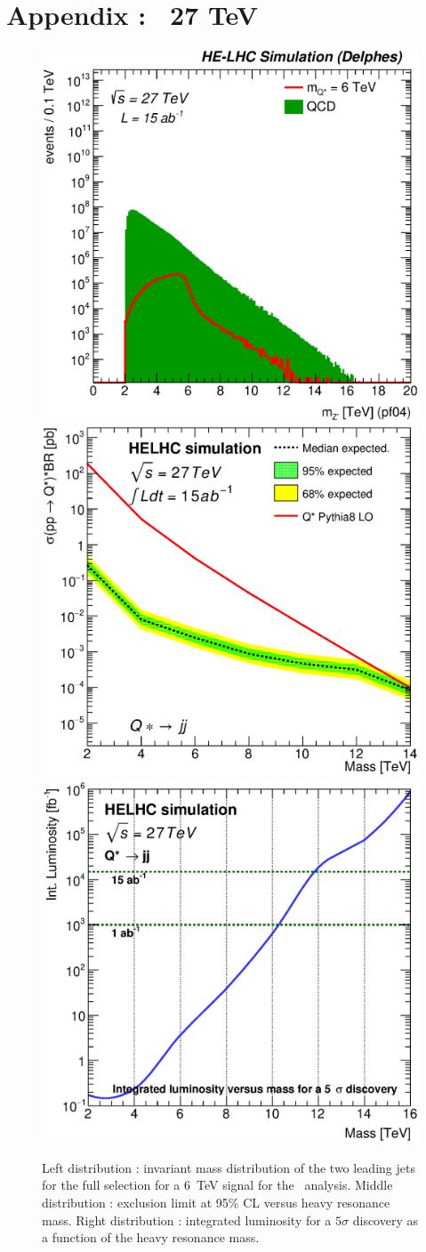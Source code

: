 \clearpage
\newpage

\section{Appendix :  \texorpdfstring{\qjj}{qjj}\ 27 TeV}
\label{appendix:qstarjj27}

\begin{figure}[!htb]
  \centering
  \includegraphics[width=0.30\columnwidth]{Fig/27tev/qq_Mj1j2_pf04_sel1_nostack_log.eps}
  \includegraphics[width=0.30\columnwidth]{Fig/27tev/lim_Qstar_jj_helhc_v01.eps}
  \includegraphics[width=0.30\columnwidth]{Fig/27tev/DiscoveryPotential_jj_rootStyle.eps}
  \caption{Left distribution : invariant mass distribution of the two leading jets for the full selection for a 6~TeV signal for the \qjj\ analysis. Middle distribution : exclusion limit at 95\% CL versus heavy resonance mass. Right distribution : integrated luminosity for a $5\sigma$ discovery as a function of the heavy resonance mass.}
  \label{figure:hadronicresonances27:qqsel01}
\end{figure}

